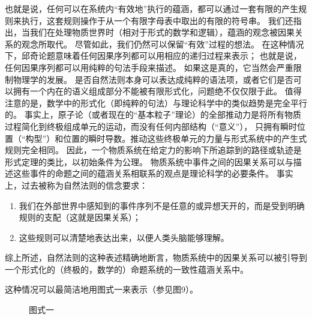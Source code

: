 \documentclass[a4paper,12pt]{article}
\begin{document}
也就是说，任何可以在系统内“有效地”执行的蕴涵，都可以通过一套有限的产生规则来执行，这套规则操作于从一个有限字母表中取出的有限的符号串。
我们还指出，当我们在处理物质世界时（相对于形式的数学和逻辑），蕴涵的观念被因果关系的观念所取代。
尽管如此，我们仍然可以保留“有效”过程的想法。 在这种情况下，邱奇论题意味着任何因果序列都可以用相应的递归过程来表示；
也就是说，任何因果序列都可以用纯粹的句法手段来描述。 如果这是真的，它当然会严重限制物理学的发展。
是否自然法则本身可以表达成纯粹的语法项，或者它们是否可以拥有一个内在的语义组成部分不能被有限形式化，问题绝不仅仅限于此。
值得注意的是，数学中的形式化（即纯粹的句法）与理论科学中的类似趋势是完全平行的。
事实上，原子论（或者现在的“基本粒子”理论）的全部推动力是将所有物质过程简化到终极组成单元的运动，而没有任何内部结构（“意义”），
只拥有瞬时位置（“构型”）和位置的瞬时导数。推动这些终极单元的力量与形式系统中的产生式规则完全相同。
因此，一个物质系统在给定力的影响下所追踪到的路径或轨迹是形式定理的类比，以初始条件为公理。
物质系统中事件之间的因果关系可以与描述这些事件的命题之间的蕴涵关系相联系的观点是理论科学的必要条件。
事实上，过去被称为自然法则的信念要求：
\begin{enumerate}[label=(\alph*)]
\item 我们在外部世界中感知到的事件序列不是任意的或异想天开的，而是受到明确规则的支配（这就是因果关系）；
\item 这些规则可以清楚地表达出来，以便人类头脑能够理解。
\end{enumerate}
综上所述，自然法则的这种表述精确地断言，物质系统中的因果关系可以被引导到一个形式化的（终极的，数学的）命题系统的一致性蕴涵关系中。

这种情况可以最简洁地用图式一来表示（参见图9）。

\begin{figure}[ht]
\centering
{}
\caption{图式一}
\end{figure}
\end{document}
